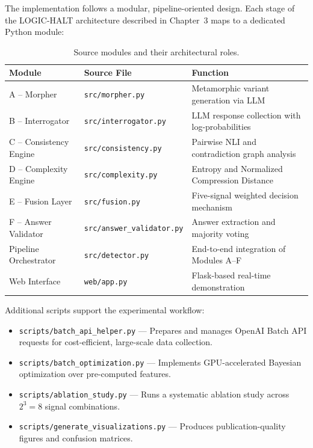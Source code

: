 The implementation follows a modular, pipeline-oriented design. Each stage of the LOGIC-HALT architecture described in Chapter~3 maps to a dedicated Python module:

\begin{table}[!htbp]
    \centering
    \caption{Source modules and their architectural roles.}
    \label{tab:modules}
    \begin{tabular}{lll}
        \toprule
        \textbf{Module} & \textbf{Source File} & \textbf{Function} \\
        \midrule
        A -- Morpher           & \texttt{src/morpher.py}            & Metamorphic variant generation via LLM \\
        B -- Interrogator      & \texttt{src/interrogator.py}       & LLM response collection with log-probabilities \\
        C -- Consistency Engine & \texttt{src/consistency.py}       & Pairwise NLI and contradiction graph analysis \\
        D -- Complexity Engine  & \texttt{src/complexity.py}        & Entropy and Normalized Compression Distance \\
        E -- Fusion Layer       & \texttt{src/fusion.py}            & Five-signal weighted decision mechanism \\
        F -- Answer Validator   & \texttt{src/answer\_validator.py} & Answer extraction and majority voting \\
        Pipeline Orchestrator   & \texttt{src/detector.py}          & End-to-end integration of Modules A--F \\
        Web Interface           & \texttt{web/app.py}               & Flask-based real-time demonstration \\
        \bottomrule
    \end{tabular}
\end{table}

Additional scripts support the experimental workflow:

\begin{itemize}
    \item \texttt{scripts/batch\_api\_helper.py} --- Prepares and manages OpenAI Batch API requests for cost-efficient, large-scale data collection.
    \item \texttt{scripts/batch\_optimization.py} --- Implements GPU-accelerated Bayesian optimization over pre-computed features.
    \item \texttt{scripts/ablation\_study.py} --- Runs a systematic ablation study across $2^3 = 8$ signal combinations.
    \item \texttt{scripts/generate\_visualizations.py} --- Produces publication-quality figures and confusion matrices.
\end{itemize}

